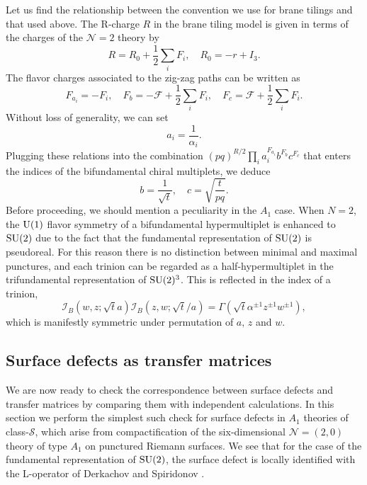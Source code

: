 Let us find the relationship between the convention we use for brane
tilings and that used above. The R-charge $R$ in the brane tiling
model is given in terms of the charges of the $\mathcal{N}=2$ theory
by
\begin{equation}
    R  =  R_{0}  +  \frac{1}{2}\sum_{i}F_{i},
      \quad  R_{0}  =  -r+I_{3}.
\end{equation}
The flavor charges associated to the zig-zag paths can be written
as
\begin{equation}
    F_{a_{i}}  =  -F_{i},
      \quad  F_{b}  =  -\mathcal{F}+\frac{1}{2}\sum_{i}F_{i},
      \quad  F_{c}  =  \mathcal{F}+\frac{1}{2}\sum_{i}F_{i}.
\end{equation}
Without loss of generality, we can set
\begin{equation}
    a_{i}  =  \frac{1}{\alpha_{i}}.
\end{equation}
Plugging these relations into the combination $(pq)^{R/2}\prod_{i}a_{i}^{F_{a_{i}}}b^{F_{b}}c^{F_{c}}$
that enters the indices of the bifundamental chiral multiplets, we
deduce
\begin{equation}
    b  =  \frac{1}{\sqrt{t}},
      \quad  c  =  \sqrt{\frac{t}{pq}}.
  \label{eq:relation_bc}
\end{equation}
Before proceeding, we should mention a peculiarity in the $A_{1}$
case. When $N=2$, the $\mathrm{U}(1)$ flavor symmetry of a bifundamental hypermultiplet
is enhanced to $\mathrm{SU}(2)$ due to the fact that the fundamental representation
of $\mathrm{SU}(2)$ is pseudoreal. For this reason there is no distinction
between minimal and maximal punctures, and each trinion can be regarded
as a half-hypermultiplet in the trifundamental representation of $\mathrm{SU}(2)^{3}$.
This is reflected in the index of a trinion,
\begin{equation}
    \mathcal{I}_{B}(w,z;\sqrt{t}a)\mathcal{I}_{B}(z,w;\sqrt{t}/a)
      =
        \Gamma(\sqrt{t}\alpha^{\pm1}z^{\pm1}w^{\pm1}),
\end{equation}
which is manifestly symmetric under permutation of $a,\,z$ and $w$.








\subsection{Surface defects as transfer matrices}
\label{sec:surface_defects}


We are now ready to check the correspondence between surface defects and transfer matrices
by comparing them with independent calculations. In this section we
perform the simplest such check for surface defects in $A_{1}$ theories
of class-$\mathcal{S}$,
which arise from compactification
of the six-dimensional $\mathcal{N}=(2,0)$ theory of type $A_{1}$
on punctured Riemann surfaces.
We see that for the case of the fundamental representation of $\mathrm{SU}(2)$,
the surface defect is locally identified with the L-operator of
Derkachov and Spiridonov \cite{Derkachov:2012iv}.


